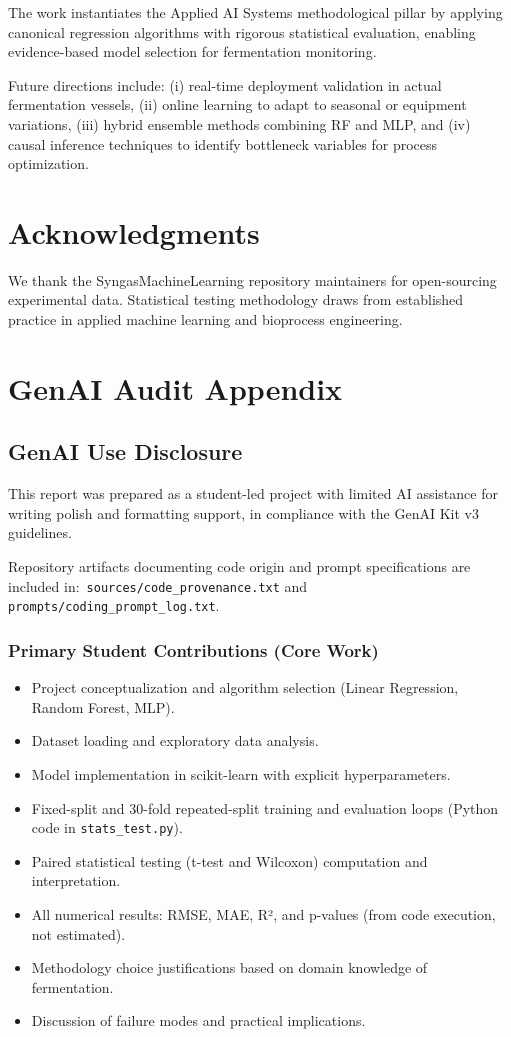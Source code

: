 \documentclass[conference]{IEEEtran}
\begin{document}
The work instantiates the Applied AI Systems methodological pillar by applying canonical regression algorithms with rigorous statistical evaluation, enabling evidence-based model selection for fermentation monitoring.

Future directions include: (i) real-time deployment validation in actual fermentation vessels, (ii) online learning to adapt to seasonal or equipment variations, (iii) hybrid ensemble methods combining RF and MLP, and (iv) causal inference techniques to identify bottleneck variables for process optimization.

\section*{Acknowledgments}
We thank the SyngasMachineLearning repository maintainers for open-sourcing experimental data. Statistical testing methodology draws from established practice in applied machine learning and bioprocess engineering.

\section*{GenAI Audit Appendix}

\subsection*{GenAI Use Disclosure}
This report was prepared as a student-led project with limited AI assistance for writing polish and formatting support, in compliance with the GenAI Kit v3 guidelines.

Repository artifacts documenting code origin and prompt specifications are included in:\
\texttt{sources/code\_provenance.txt} and \texttt{prompts/coding\_prompt\_log.txt}.

\subsubsection*{Primary Student Contributions (Core Work)}
\begin{itemize}
\item Project conceptualization and algorithm selection (Linear Regression, Random Forest, MLP).
\item Dataset loading and exploratory data analysis.
\item Model implementation in scikit-learn with explicit hyperparameters.
\item Fixed-split and 30-fold repeated-split training and evaluation loops (Python code in \texttt{stats\_test.py}).
\item Paired statistical testing (t-test and Wilcoxon) computation and interpretation.
\item All numerical results: RMSE, MAE, R², and p-values (from code execution, not estimated).
\item Methodology choice justifications based on domain knowledge of fermentation.
\item Discussion of failure modes and practical implications.
\end{itemize}
\end{document}
